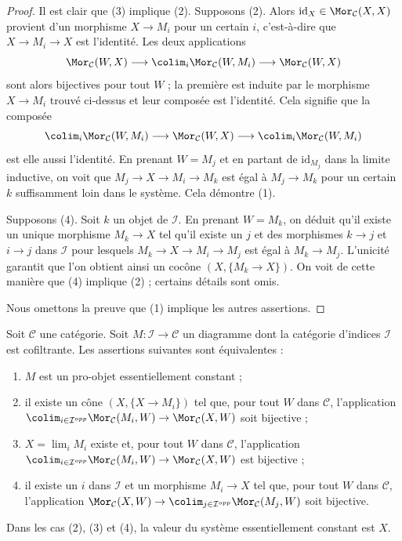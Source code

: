 \begin{proof}
Il est clair que (3) implique (2). Supposons (2). Alors
$\text{id}_X \in \Mor_\mathcal{C}(X, X)$ provient d'un morphisme
$X \to M_i$ pour un certain $i$, c'est-à-dire que $X \to M_i \to X$ est
l'identité. Les deux applications
$$
\Mor_\mathcal{C}(W, X)
\longrightarrow
\colim_i \Mor_\mathcal{C}(W, M_i)
\longrightarrow
\Mor_\mathcal{C}(W, X)
$$
sont alors bijectives pour tout $W$ ; la première est induite par le morphisme
$X \to M_i$ trouvé ci-dessus et leur composée est l'identité. Cela signifie
que la composée
$$
\colim_i \Mor_\mathcal{C}(W, M_i)
\longrightarrow
\Mor_\mathcal{C}(W, X)
\longrightarrow
\colim_i \Mor_\mathcal{C}(W, M_i)
$$
est elle aussi l'identité. En prenant $W = M_j$ et en partant de
$\text{id}_{M_j}$ dans la limite inductive, on voit que
$M_j \to X \to M_i \to M_k$ est égal à $M_j \to M_k$ pour un certain $k$
suffisamment loin dans le système. Cela démontre (1).

\medskip\noindent
Supposons (4). Soit $k$ un objet de $\mathcal{I}$. En prenant $W = M_k$,
on déduit qu'il existe un unique morphisme $M_k \to X$ tel qu'il existe un
$j$ et des morphismes $k \to j$ et $i \to j$ dans $\mathcal{I}$ pour lesquels
$M_k \to X \to M_i \to M_j$ est égal à $M_k \to M_j$. L'unicité garantit
que l'on obtient ainsi un cocône $(X, \{M_k \to X\})$. On voit de cette
manière que (4) implique (2) ; certains détails sont omis.

\medskip\noindent
Nous omettons la preuve que (1) implique les autres assertions.
\end{proof}

\begin{lemma}
\label{lemma-characterize-essentially-constant-pro}
Soit $\mathcal{C}$ une catégorie. Soit $M : \mathcal{I} \to \mathcal{C}$
un diagramme dont la catégorie d'indices $\mathcal{I}$ est cofiltrante.
Les assertions suivantes sont équivalentes :
\begin{enumerate}
\item $M$ est un pro-objet essentiellement constant ;
\item il existe un cône $(X, \{X \to M_i\})$ tel que, pour tout $W$ dans
$\mathcal{C}$, l'application
$\colim_{i \in \mathcal{I}^{opp}} \Mor_\mathcal{C}(M_i, W) \to
\Mor_\mathcal{C}(X, W)$ soit bijective ;
\item $X = \lim_i M_i$ existe et, pour tout $W$ dans $\mathcal{C}$,
l'application
$\colim_{i \in \mathcal{I}^{opp}} \Mor_\mathcal{C}(M_i, W) \to
\Mor_\mathcal{C}(X, W)$ est bijective ;
\item il existe un $i$ dans $\mathcal{I}$ et un morphisme $M_i \to X$ tel que, pour tout $W$ dans $\mathcal{C}$, l'application
$\Mor_\mathcal{C}(X, W) \to
\colim_{j \in \mathcal{I}^{opp}} \Mor_\mathcal{C}(M_j, W)$ soit bijective.
\end{enumerate}
Dans les cas (2), (3) et (4), la valeur du système essentiellement constant
est $X$.
\end{lemma}

